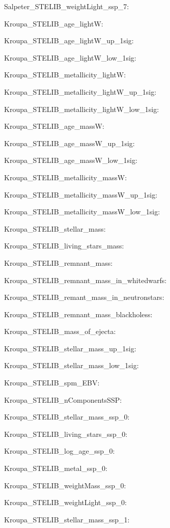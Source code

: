 \item Salpeter\_STELIB\_weightLight\_ssp\_7: 
\item Kroupa\_STELIB\_age\_lightW: 
\item Kroupa\_STELIB\_age\_lightW\_up\_1sig: 
\item Kroupa\_STELIB\_age\_lightW\_low\_1sig: 
\item Kroupa\_STELIB\_metallicity\_lightW: 
\item Kroupa\_STELIB\_metallicity\_lightW\_up\_1sig: 
\item Kroupa\_STELIB\_metallicity\_lightW\_low\_1sig: 
\item Kroupa\_STELIB\_age\_massW: 
\item Kroupa\_STELIB\_age\_massW\_up\_1sig: 
\item Kroupa\_STELIB\_age\_massW\_low\_1sig: 
\item Kroupa\_STELIB\_metallicity\_massW: 
\item Kroupa\_STELIB\_metallicity\_massW\_up\_1sig: 
\item Kroupa\_STELIB\_metallicity\_massW\_low\_1sig: 
\item Kroupa\_STELIB\_stellar\_mass: 
\item Kroupa\_STELIB\_living\_stars\_mass: 
\item Kroupa\_STELIB\_remnant\_mass: 
\item Kroupa\_STELIB\_remnant\_mass\_in\_whitedwarfs: 
\item Kroupa\_STELIB\_remant\_mass\_in\_neutronstars: 
\item Kroupa\_STELIB\_remnant\_mass\_blackholess: 
\item Kroupa\_STELIB\_mass\_of\_ejecta: 
\item Kroupa\_STELIB\_stellar\_mass\_up\_1sig: 
\item Kroupa\_STELIB\_stellar\_mass\_low\_1sig: 
\item Kroupa\_STELIB\_spm\_EBV: 
\item Kroupa\_STELIB\_nComponentsSSP: 
\item Kroupa\_STELIB\_stellar\_mass\_ssp\_0: 
\item Kroupa\_STELIB\_living\_stars\_ssp\_0: 
\item Kroupa\_STELIB\_log\_age\_ssp\_0: 
\item Kroupa\_STELIB\_metal\_ssp\_0: 
\item Kroupa\_STELIB\_weightMass\_ssp\_0: 
\item Kroupa\_STELIB\_weightLight\_ssp\_0: 
\item Kroupa\_STELIB\_stellar\_mass\_ssp\_1: 
